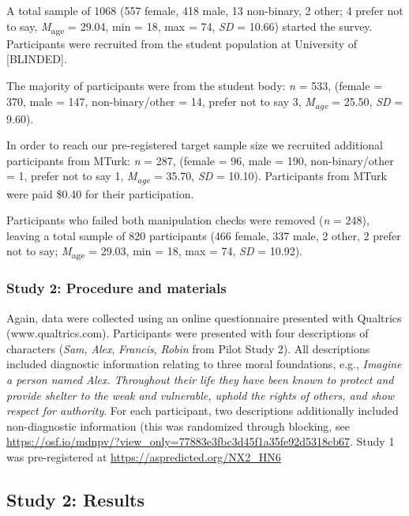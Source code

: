 \documentclass[
  man,floatsintext]{apa6}
\begin{document}
A total sample of 1068 (557 female, 418 male, 13 non-binary, 2 other; 4 prefer not to say, \emph{M}\textsubscript{age} = 29.04, min = 18, max = 74, \emph{SD} = 10.66) started the survey. Participants were recruited from the student population at University of {[}BLINDED{]}.

The majority of participants were from the student body: \emph{n} = 533, (female = 370, male = 147, non-binary/other = 14, prefer not to say 3, \emph{M\textsubscript{age}} = 25.50, \emph{SD} = 9.60).

In order to reach our pre-registered target sample size we recruited additional participants from MTurk: \emph{n} = 287, (female = 96, male = 190, non-binary/other = 1, prefer not to say 1, \emph{M\textsubscript{age}} = 35.70, \emph{SD} = 10.10). Participants from MTurk were paid \$0.40 for their participation.

Participants who failed both manipulation checks were removed (\emph{n} = 248), leaving a total sample of 820 participants (466 female, 337 male, 2 other, 2 prefer not to say; \emph{M}\textsubscript{age} = 29.03, min = 18, max = 74, \emph{SD} = 10.92).

\subsubsection{Study 2: Procedure and materials}\label{study-2-procedure-and-materials}

Again, data were collected using an online questionnaire presented with Qualtrics (www.qualtrics.com). Participants were presented with four descriptions of characters (\emph{Sam}, \emph{Alex}, \emph{Francis}, \emph{Robin} from Pilot Study 2). All descriptions included diagnostic information relating to three moral foundations, e.g., \emph{Imagine a person named Alex. Throughout their life they have been known to protect and provide shelter to the weak and vulnerable, uphold the rights of others, and show respect for authority}. For each participant, two descriptions additionally included non-diagnostic information (this was randomized through blocking, see \color{blue}\url{https://osf.io/mdnpv/?view_only=77883e3fbc3d45f1a35fe92d5318cb67}\color{black}. Study 1 was pre-registered at \color{blue}\url{https://aspredicted.org/NX2_HN6}\color{black}

\subsection{Study 2: Results}\label{study-2-results}
\end{document}
